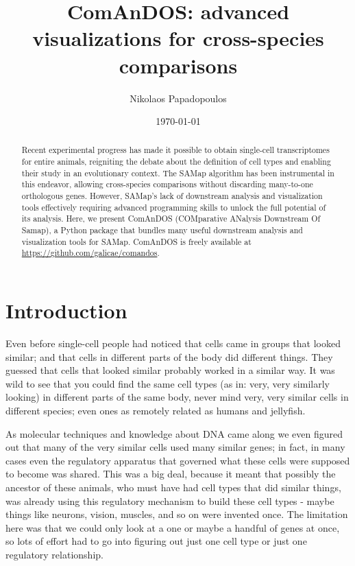 \documentclass{article}
\begin{document}
\title{ComAnDOS: advanced visualizations for cross-species comparisons}
\author{Nikolaos Papadopoulos}
\date{\today}

\maketitle
\begin{abstract}
    Recent experimental progress has made it possible to obtain single-cell transcriptomes for
    entire animals, reigniting the debate about the definition of cell types and enabling their
    study in an evolutionary context. The SAMap algorithm has been instrumental in this endeavor,
    allowing cross-species comparisons without discarding many-to-one orthologous genes. However,
    SAMap's lack of downstream analysis and visualization tools effectively requiring advanced
    programming skills to unlock the full potential of its analysis. Here, we present ComAnDOS
    (COMparative ANalysis Downstream Of Samap), a Python package that bundles many useful downstream
    analysis and visualization tools for SAMap. ComAnDOS is freely available at
    \url{https://github.com/galicae/comandos}.
\end{abstract}

\section{Introduction}

Even before single-cell people had noticed that cells came in groups that looked similar; and that
cells in different parts of the body did different things. They guessed that cells that looked
similar probably worked in a similar way. It was wild to see that you could find the same cell types
(as in: very, very similarly looking) in different parts of the same body, never mind very, very
similar cells in different species; even ones as remotely related as humans and jellyfish.

As molecular techniques and knowledge about DNA came along we even figured out that many of the very
similar cells used many similar genes; in fact, in many cases even the regulatory apparatus that
governed what these cells were supposed to become was shared. This was a big deal, because it meant
that possibly the ancestor of these animals, who must have had cell types that did similar things,
was already using this regulatory mechanism to build these cell types - maybe things like neurons,
vision, muscles, and so on were invented once. The limitation here was that we could only look at a
one or maybe a handful of genes at once, so lots of effort had to go into figuring out just one cell
type or just one regulatory relationship.
\end{document}
